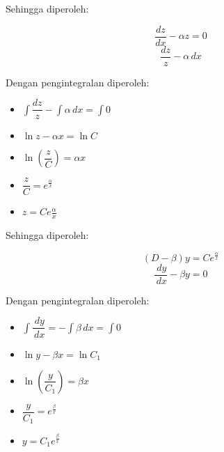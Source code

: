 Sehingga diperoleh:

\begin{displaymath} \dfrac{dz}{dx} - \alpha z = 0 \end{displaymath} 
\begin{displaymath} \dfrac{dz}{z} - \alpha \, dx \end{displaymath} 

Dengan pengintegralan diperoleh:

\begin{itemize}

\item[] \begin{math} \int \dfrac{dz}{z} - \int \alpha \, dx = \int 0 \end{math}
\item[] \begin{math} \ln z - \alpha x =\ln C \end{math}
\item[] \begin{math} \ln(\dfrac{z}{C}) = \alpha x \end{math}
\item[] \begin{math} \dfrac{z}{C} = e^{\frac{\alpha}{x}} \end{math}
\item[] \begin{math} z = Ce{\frac{\alpha}{x}} \end{math}

\end{itemize}

Sehingga diperoleh:

\begin{displaymath} (D - \beta)y = Ce^{\frac{\alpha}{x}} \end{displaymath}
\begin{displaymath} \dfrac{\, dy}{\, dx} - \beta y = 0 \end{displaymath}

Dengan pengintegralan diperoleh:

\begin{itemize}

\item[] \begin{math} \int \dfrac{\, dy}{\, dx} = -\int \beta \, dx = \int 0 \end{math}
\item[] \begin{math} \ln y - \beta x = \ln C_1 \end{math} 
\item[] \begin{math} \ln (\dfrac{y}{C_1}) = \beta x \end{math} 
\item[] \begin{math} \dfrac{y}{C_1} = e^{\frac{\beta}{x}} \end{math} 
\item[] \begin{math} y = C_1e^{\frac{\beta}{x}} \end{math} 

\end{itemize}	

